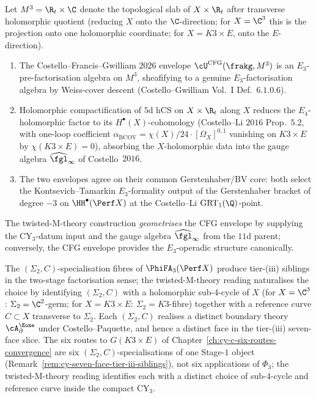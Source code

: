\begin{proposition}
\label{prop:CFG-coherence-twisted-M-theory}
Let $M^3 = \R_t \times \C$ denote the topological slab of $X \times
\R_t$ after transverse holomorphic quotient (reducing $X$ onto the
$\C$-direction; for $X = \C^3$ this is the projection onto one
holomorphic coordinate; for $X = K3 \times E$, onto the $E$-direction).
\begin{enumerate}[label=(\roman*)]
\item The Costello--Francis--Gwilliam $2026$ envelope
$\cU^{\mathrm{CFG}}(\frakg, M^3)$ is an $E_3$-pre-factorisation algebra
on $M^3$, sheafifying to a genuine $E_3$-factorisation algebra by
Weiss-cover descent (Costello--Gwilliam Vol.~I Def.~$6.1.0.6$).
\item Holomorphic compactification of $5$d hCS on $X \times \R_t$
along $X$ reduces the $E_4$-holomorphic factor to its
$H^\bullet(X)$-cohomology (Costello--Li $2016$ Prop.~$5.2$, with
one-loop coefficient $\alpha_{\mathrm{BCOV}} = \chi(X)/24 \cdot
[\Omega_X]^{0,1}$ vanishing on $K3 \times E$ by $\chi(K3 \times E)
= 0$), absorbing the $X$-holomorphic data into the gauge algebra
$\widehat{\fgl}_\infty$ of Costello~$2016$.
\item The two envelopes agree on their common Gerstenhaber/BV core:
both select the Kontsevich--Tamarkin $E_3$-formality output of the
Gerstenhaber bracket of degree $-3$ on
$\HH^\bullet(\Perf X)$ at the Costello--Li
$\mathrm{GRT}_1(\Q)$-point.
\end{enumerate}
The twisted-M-theory construction \emph{geometrises} the CFG envelope
by supplying the CY$_3$-datum input and the gauge algebra
$\widehat{\fgl}_\infty$ from the $11$d parent; conversely, the CFG
envelope provides the $E_3$-operadic structure canonically.
\end{proposition}

\begin{remark}
\label{rem:bulk-boundary-spch-natural}
The $(\Sigma_2, C)$-specialisation fibres of $\PhiFA_3(\Perf X)$
produce tier-\textup{(iii)} siblings in the two-stage factorisation
sense; the twisted-M-theory reading naturalises the choice by
identifying $(\Sigma_2, C)$ with a holomorphic sub-4-cycle of $X$
(for $X = \C^3$: $\Sigma_2 = \C^2$-germ; for $X = K3 \times E$:
$\Sigma_2 = K3$-fibre) together with a reference curve $C \subset X$
transverse to $\Sigma_2$. Each $(\Sigma_2, C)$ realises a distinct
boundary theory $\cA^{\Eone}_\partial$ under Costello--Paquette, and
hence a distinct face in the tier-\textup{(iii)} seven-face slice. The
six routes to $G(K3 \times E)$ of Chapter~\ref{ch:cy-c-six-routes-convergence}
are six $(\Sigma_2, C)$-specialisations of one Stage-$1$ object
(Remark~\ref{rem:cy-seven-face-tier-iii-siblings}), not six applications
of $\Phi_3$; the twisted-M-theory reading identifies each with a
distinct choice of sub-4-cycle and reference curve inside the compact
CY$_3$.
\end{remark}

